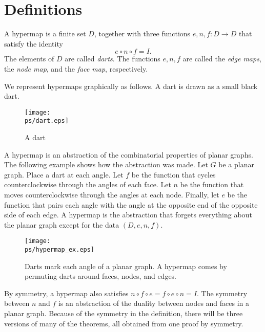 


\section{Definitions}



\begin{definition}  A hypermap is a finite set $D$, together with
three functions $e,n,f:D\to D$ that satisfy the identity
    $$e\circ n\circ f = I.$$
The elements of $D$ are called {\it darts}.  The functions $e,n,f$
are called the {\it edge maps}, the {\it node map}, and the {\it
face map}, respectively.
\end{definition}



\begin{remark*} We represent hypermaps graphically as follows.  A
dart is drawn as a small black dart.
\end{remark*}

\begin{figure}[htb]
  \centering
  \texttt{[image: \\ps/dart.eps]}
  \caption{A dart}
  \label{fig:dart}
\end{figure}

\begin{remark*}\label{rem:hypermap} A hypermap is an abstraction of
the combinatorial properties of planar graphs.  The following
example shows how the abstraction was made.  Let $G$ be a planar
graph.  Place a dart at each angle.    Let $f$ be the function that
cycles counterclockwise through the angles of each face.  Let $n$ be
the function that moves counterclockwise through the angles at each
node.  Finally, let $e$ be the function that pairs each angle with
the angle at the opposite end of the opposite side of each edge.  A
hypermap is the abstraction that forgets everything about the planar
graph except for the data $(D,e,n,f)$.
\end{remark*}

\begin{figure}[htb]
  \centering
  \texttt{[image: \\ps/hypermap\_ex.eps]}
  \caption{Darts mark each angle of a planar graph. A hypermap comes by
  permuting darts around faces, nodes, and edges.}
  \label{fig:hypermap_ex}
\end{figure}

By symmetry, a hypermap also satisfies $n\circ f\circ e = f\circ
e\circ n = I$.  The symmetry between $n$ and $f$ is an abstraction
of the duality between nodes and faces in a planar graph. Because of
the symmetry in the definition, there will be three versions of many
of the theorems, all obtained from one proof by symmetry.

